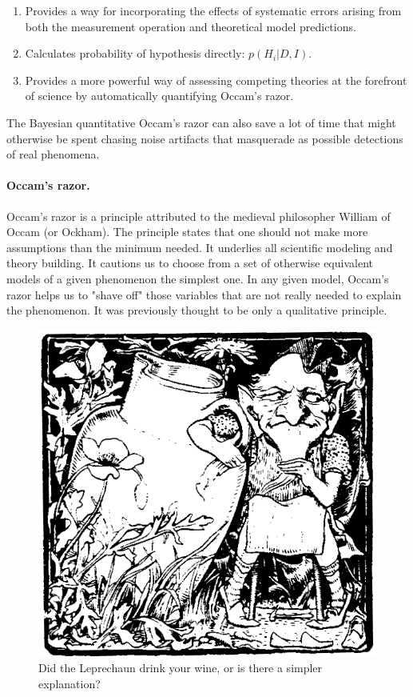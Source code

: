 \documentclass[%
oneside,                 %
final,                   %
10pt]{article}
\begin{document}
\begin{enumerate}
\item Provides a way for incorporating the effects of systematic errors arising from both the measurement operation and theoretical model predictions.

\item Calculates probability of hypothesis directly: $p(H_i|D, I)$.

\item Provides a more powerful way of assessing competing theories at the forefront of science by automatically quantifying Occam’s razor.
\end{enumerate}

\noindent

The Bayesian quantitative Occam’s razor can also save a lot of time that might otherwise be spent chasing noise artifacts that masquerade as possible detections of real phenomena.

\paragraph{Occam's razor.}
Occam’s razor is a principle attributed to the medieval philosopher William of Occam (or Ockham). The principle states that one should not make more assumptions than the minimum needed. It underlies all scientific modeling and theory building. It cautions us to choose from a set of otherwise equivalent models of a given phenomenon the simplest one. In any given model, Occam’s razor helps us to "shave off" those variables that are not really needed to explain the phenomenon. It was previously thought to be only a qualitative principle.


\begin{figure}[!ht]  %
  \centerline{\includegraphics[width=0.7\linewidth]{fig/Leprechaun_or_Clurichaun.png}}
  \caption{
  Did the Leprechaun drink your wine, or is there a simpler explanation?
  }
\end{figure}
\end{document}
